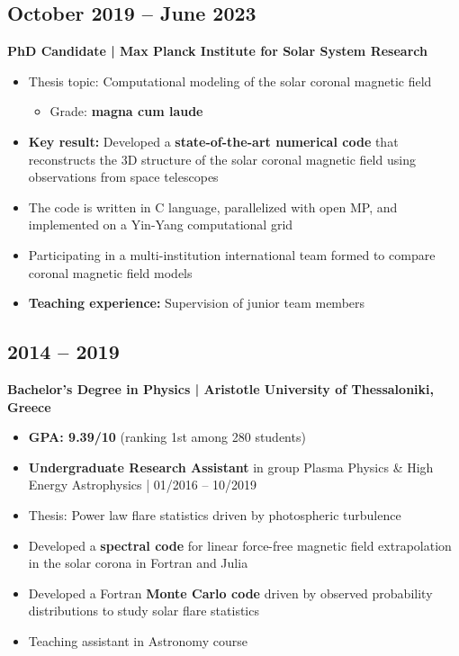 \documentclass[11pt,a4paper]{article}
\begin{document}
\begin{multicols}{2}
		\subsection{October 2019 – June 2023}
		\textbf{PhD Candidate | Max Planck Institute for Solar System Research}
		\begin{itemize}
			\item Thesis topic: Computational modeling of the solar coronal magnetic field
			\begin{itemize}
				\item Grade: \textbf{magna cum laude}
			\end{itemize}
			\item \textbf{Key result:} Developed a \textbf{state-of-the-art numerical code} that reconstructs the 3D structure of the solar coronal magnetic field using observations from space telescopes
			\item The code is written in C language, parallelized with open MP, and implemented on a Yin-Yang computational grid
			\item Participating in a multi-institution international team formed to compare coronal magnetic field models
			\item \textbf{Teaching experience:} Supervision of junior team members
		\end{itemize}
		
		\subsection{2014 – 2019}
		\textbf{Bachelor's Degree in Physics | Aristotle University of Thessaloniki, Greece}
		\begin{itemize}
			\item \textbf{GPA: 9.39/10} (ranking 1st among 280 students)
			\item \textbf{Undergraduate Research Assistant} in group Plasma Physics \& High Energy Astrophysics | 01/2016 – 10/2019
			\item Thesis: Power law flare statistics driven by photospheric turbulence
			\item Developed a \textbf{spectral code} for linear force-free magnetic field extrapolation in the solar corona in Fortran and Julia
			\item Developed a Fortran \textbf{Monte Carlo code} driven by observed probability distributions to study solar flare statistics
			\item Teaching assistant in Astronomy course
		\end{itemize}
		

\end{multicols}
\end{document}
